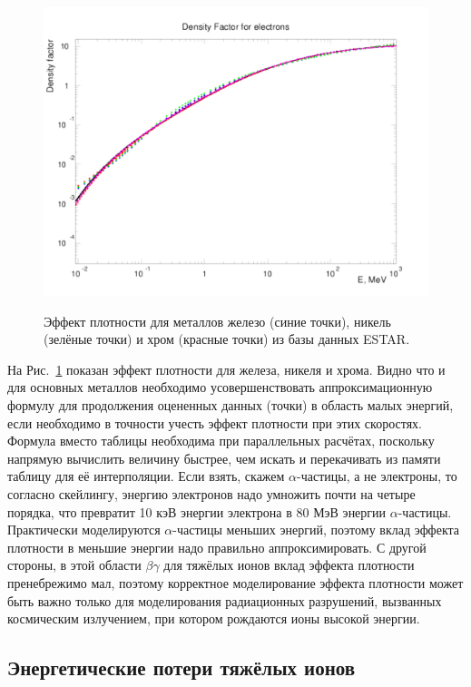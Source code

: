 \documentclass[a4paper,12pt]{article}
\begin{document}
\begin{large}
  \begin{figure}[ht]
    {
       \includegraphics[width=0.99\linewidth]{images/denf_metal}
    }
    \caption{Эффект плотности для металлов железо (синие точки), никель (зелёные точки) и хром (красные точки) из базы данных ESTAR.}
    \label{fig:denf_metal}
  \end{figure}
  На Рис.~\ref{fig:denf_metal} показан эффект плотности для железа, никеля и хрома.
  Видно что и для основных металлов необходимо усовершенствовать аппроксимационную формулу для продолжения оцененных данных (точки) в область малых энергий, если необходимо в точности учесть эффект плотности при этих скоростях.
  Формула вместо таблицы необходима при параллельных расчётах, поскольку напрямую вычислить величину быстрее, чем искать и перекачивать из памяти таблицу для её интерполяции.
  Если взять, скажем $\alpha$-частицы, а не электроны, то согласно скейлингу, энергию электронов надо умножить почти на четыре порядка, что превратит 10 кэВ энергии электрона в 80 МэВ энергии $\alpha$-частицы.
  Практически моделируются $\alpha$-частицы меньших энергий, поэтому вклад эффекта плотности в меньшие энергии надо правильно аппроксимировать.
  С другой стороны, в этой области $\beta\gamma$ для тяжёлых ионов вклад эффекта плотности пренебрежимо мал, поэтому корректное моделирование эффекта плотности может быть важно только для моделирования радиационных разрушений, вызванных космическим излучением, при котором рождаются ионы высокой энергии.

\subsection{Энергетические потери тяжёлых ионов}
\label{dEdx3}


\end{large}
\end{document}
